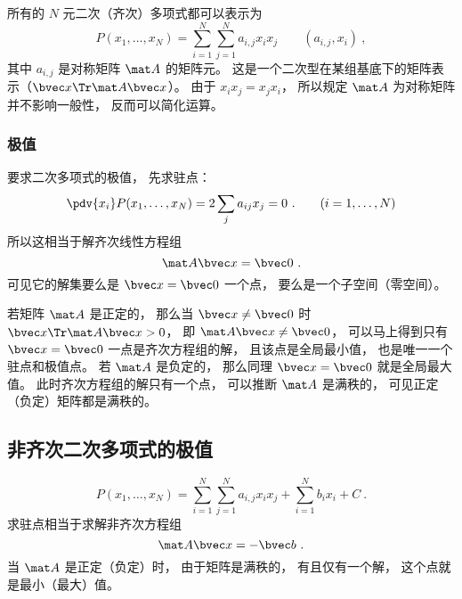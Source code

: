 

所有的 $N$ 元二次（齐次）多项式都可以表示为
\begin{equation}
P(x_1,\dots,x_N) = \sum_{i=1}^N\sum_{j=1}^N a_{i,j}x_i x_j \qquad (a_{i,j}, x_i)~,
\end{equation}
其中 $a_{i,j}$ 是对称矩阵 $\mat A$ 的矩阵元。 这是一个二次型在某组基底下的矩阵表示（$\bvec x\Tr \mat A \bvec x$）。 由于 $x_i x_j = x_j x_i$， 所以规定 $\mat A$ 为对称矩阵并不影响一般性， 反而可以简化运算。

\subsubsection{极值}
要求二次多项式的极值， 先求驻点：
\begin{equation}
\pdv{x_i}P(x_1,\dots,x_N) = 2\sum_j a_{ij} x_j = 0 ~.\qquad (i = 1,\dots,N)
\end{equation}
所以这相当于解齐次线性方程组
\begin{equation}
\mat A \bvec x = \bvec 0~.
\end{equation}
可见它的解集要么是 $\bvec x = \bvec 0$ 一个点， 要么是一个子空间（零空间）。

若矩阵 $\mat A$ 是正定的， 那么当 $\bvec x \ne \bvec 0$ 时 $\bvec x\Tr \mat A \bvec x > 0$， 即 $\mat A \bvec x \ne \bvec 0$， 可以马上得到只有 $\bvec x = \bvec 0$ 一点是齐次方程组的解， 且该点是全局最小值， 也是唯一一个驻点和极值点。 若 $\mat A$ 是负定的， 那么同理 $\bvec x = \bvec 0$ 就是全局最大值。 此时齐次方程组的解只有一个点， 可以推断 $\mat A$ 是满秩的， 可见正定（负定）矩阵都是满秩的。

\subsection{非齐次二次多项式的极值}
\begin{equation}
P(x_1,\dots,x_N) = \sum_{i=1}^N\sum_{j=1}^N a_{i,j}x_i x_j + \sum_{i=1}^N b_i x_i + C~.
\end{equation}
求驻点相当于求解非齐次方程组
\begin{equation}
\mat A \bvec x = -\bvec b~.
\end{equation}
当 $\mat A$ 是正定（负定）时， 由于矩阵是满秩的， 有且仅有一个解， 这个点就是最小（最大）值。
